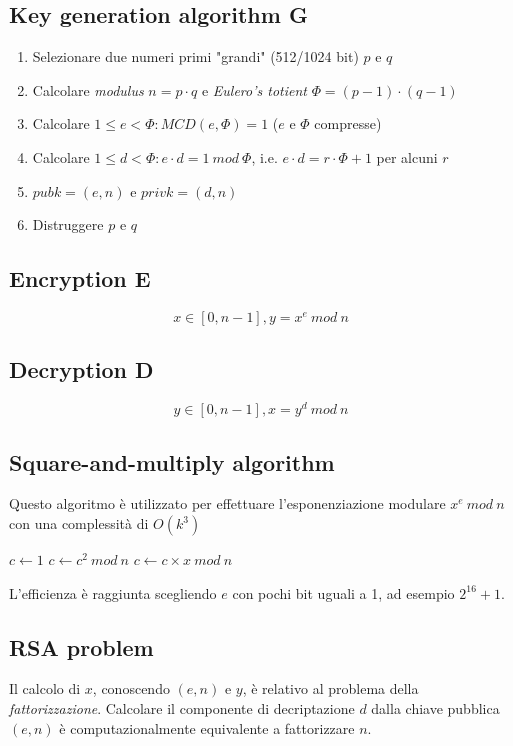 \documentclass[a4paper,12pt]{article}
\begin{document}
\subsection{Key generation algorithm G}
\begin{enumerate}
	\item Selezionare due numeri primi "grandi" (512/1024 bit) $p$ e $q$
	\item Calcolare \textit{modulus} $n = p \cdot q$ e \textit{Eulero's totient} $\Phi = (p-1)\cdot(q-1)$
	\item Calcolare $1 \leq e < \Phi : MCD(e, \Phi) = 1$ ($e$ e $\Phi$ compresse)
	\item Calcolare $1 \leq d < \Phi : e\cdot d = 1\ mod\ \Phi$, i.e. $e\cdot d = r\cdot\Phi + 1$ per alcuni $r$
	\item $pubk = (e,n)$ e $privk = (d,n)$
	\item Distruggere $p$ e $q$
\end{enumerate}

\subsection{Encryption E}
$$ x \in [0, n-1], y = x^e\ mod\ n$$

\subsection{Decryption D}
$$ y \in [0, n-1], x = y^d\ mod\ n$$

\subsection{Square-and-multiply algorithm}
Questo algoritmo è utilizzato per effettuare l'esponenziazione modulare $x^e\ mod\ n$ con una complessità di $O(k^3)$

\begin{algorithm}[H]
\begin{algorithmic}
\State $c \gets 1$
	\State $c \gets c^2\ mod\ n$
	 \State $c \gets c \times x\ mod\ n$ \EndIf
\EndFor
\end{algorithmic}
\end{algorithm}
L'efficienza è raggiunta scegliendo $e$ con pochi bit uguali a 1, ad esempio $2^{16} + 1$.

\subsection{RSA problem}
Il calcolo di $x$, conoscendo $(e,n)$ e $y$, è relativo al problema della \textit{fattorizzazione}.
Calcolare il componente di decriptazione $d$ dalla chiave pubblica $(e,n)$ è computazionalmente equivalente a fattorizzare $n$.
\end{document}
